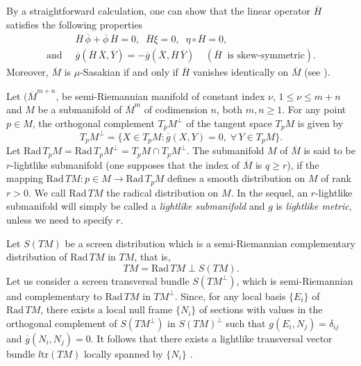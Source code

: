 \documentclass[reqno, 12pt]{amsart}
\numberwithin{equation}{section}
\begin{document}
By a straightforward calculation, one can show that the linear operator $\overline{H}$ satisfies the following properties
 \begin{align}
  & \overline{H}\,\overline{\phi} + \overline{\phi}\,\overline{H}=0,\;\;\overline{H}\xi=0,\;\;\eta\circ \overline{H}=0, \nonumber\\
  \mbox{and}\;\;& \overline{g}(\overline{H}\,\overline{X}, \overline{Y})=-\overline{g}(\overline{X}, \overline{H}\,\overline{Y})\;\;\;\; ( \overline{H} \;\;\mbox{is skew-symmetric}).
 \end{align}
Moreover,  $\overline{M}$ is $\mu$-Sasakian if and only if $\overline{H}$ vanishes identically on $\overline{M}$ (see \cite{bl2}).

Let $(\overline{M}^{m+n}$, be semi-Riemannian manifold of constant index $\nu$, $1\le \nu\le m+n$ and $M$ be a submanifold of $\overline{M}^{m}$ of codimension $n$, both $m,n\ge 1$. For any point $p\in M$, the orthogonal complement $T_{p} M^{\perp}$ of the tangent space $T_{p} M$ is given by
 $$
 T_{p} M^{\perp} = \{X\in T_{p} M: \overline{g}(X, Y)=0,\; \forall \, Y\in T_{p} M\}.
 $$
 Let  $\mathrm{Rad} \, T_{p} M = \mathrm{Rad}\, T_{p} M^{\perp} = T_{p} M \cap T_{p} M^{\perp}$. The submanifold $M$ of $\overline{M}$ is said to be $r$-lightlike submanifold (one supposes that the index of $\overline{M}$ is $q \ge r$), if the mapping 
 $
 \mathrm{Rad} \, T M: p\in M \longrightarrow\mathrm{Rad}\, T_{p} M 
 $
 defines a smooth distribution on $M$ of rank $r > 0$. We call $\mathrm{Rad}\,T M$ the radical distribution on $M$. In the sequel, an $r$-lightlike submanifold will simply be called a \textit{lightlike submanifold} and $g$ is \textit{lightlike metric}, unless we need to specify $r$.
 
 Let $S(T M)$ be a screen distribution which is a semi-Riemannian complementary distribution of $\mathrm{Rad}\,T M$ in $T M$, that is,
 \begin{equation}\label{eq05}
  T M = \mathrm{Rad}\,T M \perp S(T M).
 \end{equation} 
 Let us consider a screen transversal bundle $S(TM^\perp)$, which is semi-Riemannian and complementary to $\mathrm{Rad}\, TM$ in $TM^\perp$. Since, for any local basis $\{E_i \}$ of  $\mathrm{Rad}\,TM$, there exists a local null frame $\{N_i\}$ of sections with values in the orthogonal complement of $S(T M^\perp)$ in $S(T M )^\perp$  such that $g(E_i , N_j ) = \delta_{ij}$ and $\overline{g}(N_{i},N_{j})=0$. It follows that there exists a lightlike transversal vector bundle $l\mathrm{tr}(TM)$ locally spanned by $\{N_i\}$ \cite{db}. 
\end{document}
